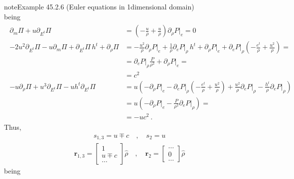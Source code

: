 \documentclass[letterpaper,10pt,english]{jupyterBook}
\begin{document}
\begin{sphinxadmonition}{note}{Example 45.2.6 (Euler equations in 1\sphinxhyphen{}dimensional domain)}
\begin{equation*}
\end{equation*}
\sphinxAtStartPar
being
\begin{equation*}
\begin{split}\begin{aligned}
  \partial_m \Pi + u \partial_{E^t} \Pi
  & = \left( - \frac{u}{\rho}  + \frac{u}{\rho} \right) \partial_\rho P \big|_e = 0 \\
  - 2u^2 \partial_{E^t} \Pi - u \partial_m \Pi + \partial_{E^t} \Pi \, h^t + \partial_{\rho} \Pi 
  & =  - \frac{u^2}{\rho} \partial_\rho P\big|_e + \frac{1}{\rho} \partial_e P\big|_\rho \, h^t + \partial_\rho P\big|_e + \partial_e P\big|_\rho \left( -\frac{e^t}{\rho} + \frac{u^2}{\rho} \right) = \\
  & = \partial_{e} P \big|_{\rho} \frac{P}{\rho^2} + \partial_{\rho} P \big|_e = \\
  & = c^2 \\
 - u \partial_{\rho} \Pi + u^3 \partial_{E^t} \Pi - u h^t \partial_{E^t} \Pi
  & = u \left( - \partial_\rho P \big|_e - \partial_e P \big|_{\rho} \left( -\frac{e^t}{\rho} + \frac{u^2}{\rho} \right) + \frac{u^2}{\rho} \partial_e P\big|_\rho - \frac{h^t}{\rho} \partial_e P\big|_{\rho}  \right) \\
  & = u \left( -\partial_\rho P\big|_e - \frac{P}{\rho^2} \partial_e P \big|_\rho \right) = \\
  & = - u c^2 \ .
\end{aligned}\end{split}
\end{equation*}
\sphinxAtStartPar
Thus,
\begin{equation*}
\begin{split}s_{1,3} = u \mp c \quad , \quad s_{2} = u \end{split}
\end{equation*}\begin{equation*}
\begin{split}
\mathbf{r}_{1,3} = \begin{bmatrix} 1 \\ u \mp c \\ \dots \end{bmatrix} \hat{\rho}
 \quad , \quad
\mathbf{r}_2 = \begin{bmatrix} \dots \\ 0 \\ \dots \end{bmatrix} \hat{\rho}
\end{split}
\end{equation*}
\sphinxAtStartPar
being

\end{sphinxadmonition}
\end{document}
